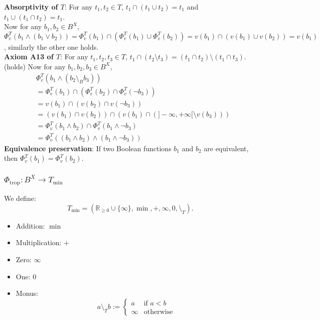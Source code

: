 \textbf{Absorptivity of $T$}:\newline
For any $t_1,t_2 \in T$, $t_1 \cap (t_1 \cup t_2) = t_1$ and $t_1 \cup (t_1 \cap t_2) = t_1$.\\
Now for any $b_1,b_2 \in B^X$, $\Phi_v^T(b_1 \wedge (b_1 \lor b_2)) = \Phi_v^T(b_1) \cap (\Phi_v^T(b_1) \cup \Phi_v^T(b_2)) = v(b_1) \cap (v(b_1) \cup v(b_2)) = v(b_1)$, similarly the other one holds.\\
\textbf{Axiom A13 of $T$}:\newline
For any $t_1,t_2,t_3 \in T$, $t_1 \cap (t_2 \setminus t_3) = (t_1 \cap t_2) \setminus (t_1 \cap t_3)$.\\ (holds)
Now for any $b_1, b_2, b_3 \in B^X$,
\[
\begin{aligned}
&\Phi_v^T(b_1 \wedge (b_2 \setminus_B b_3))\\ 
&= \Phi_v^T(b_1) \cap (\Phi_v^T(b_2) \cap \Phi_v^T(\neg b_3)) \\
&= v(b_1) \cap (v(b_2) \cap v(\neg b_3)) \\
&= (v(b_1) \cap v(b_2)) \cap (v(b_1) \cap (]-\infty,+\infty[ \setminus v(b_3))) \\
&= \Phi_v^T(b_1 \wedge b_2) \cap \Phi_v^T(b_1 \wedge \neg b_3) \\
&= \Phi_v^T((b_1 \wedge b_2) \wedge (b_1 \wedge \neg b_3))
\end{aligned}
\]
\textbf{Equivalence preservation}:\newline
If two Boolean functions $b_1$ and $b_2$ are equivalent, then $\Phi_v^T(b_1) = \Phi_v^T(b_2)$.


\subsubsection{$\Phi_{\mathrm{trop}}: B^X \to T_{\min}$}

We define:
$$
T_{\min} = (\mathbb{R}_{\ge 0} \cup \{\infty\},\min,+,\infty,0,\setminus_T).
$$
\begin{itemize}
    \item Addition: \(\min\)
    \item Multiplication: \(+\)
    \item Zero: \(\infty\)
    \item One: \(0\)
    \item Monus:
    \[
    a \setminus_T b :=
    \begin{cases}
        a & \text{if } a < b \\
        \infty & \text{otherwise}
    \end{cases}
    \]
\end{itemize}



